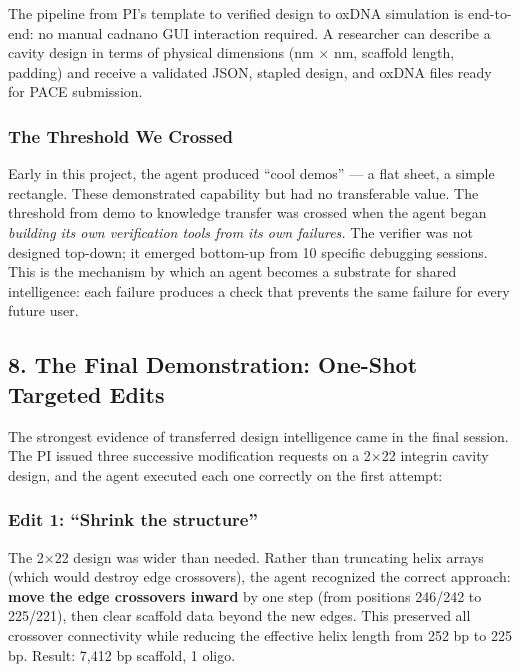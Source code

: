 \documentclass[
  11pt,
]{article}
\begin{document}
The pipeline from PI's template to verified design to oxDNA simulation
is end-to-end: no manual cadnano GUI interaction required. A researcher
can describe a cavity design in terms of physical dimensions (nm $\times$ nm,
scaffold length, padding) and receive a validated JSON, stapled design,
and oxDNA files ready for PACE submission.

\subsubsection{The Threshold We Crossed}\label{the-threshold-we-crossed}

Early in this project, the agent produced ``cool demos'' --- a flat
sheet, a simple rectangle. These demonstrated capability but had no
transferable value. The threshold from demo to knowledge transfer was
crossed when the agent began \emph{building its own verification tools
from its own failures.} The verifier was not designed top-down; it
emerged bottom-up from 10 specific debugging sessions. This is the
mechanism by which an agent becomes a substrate for shared intelligence:
each failure produces a check that prevents the same failure for every
future user.

\subsection{8. The Final Demonstration: One-Shot Targeted
Edits}\label{the-final-demonstration-one-shot-targeted-edits}

The strongest evidence of transferred design intelligence came in the
final session. The PI issued three successive modification requests on a
2$\times$22 integrin cavity design, and the agent executed each one correctly
on the first attempt:

\subsubsection{Edit 1: ``Shrink the
structure''}\label{edit-1-shrink-the-structure}

The 2$\times$22 design was wider than needed. Rather than truncating helix
arrays (which would destroy edge crossovers), the agent recognized the
correct approach: \textbf{move the edge crossovers inward} by one step
(from positions 246/242 to 225/221), then clear scaffold data beyond the
new edges. This preserved all crossover connectivity while reducing the
effective helix length from 252 bp to 225 bp. Result: 7,412 bp scaffold,
1 oligo.
\end{document}
